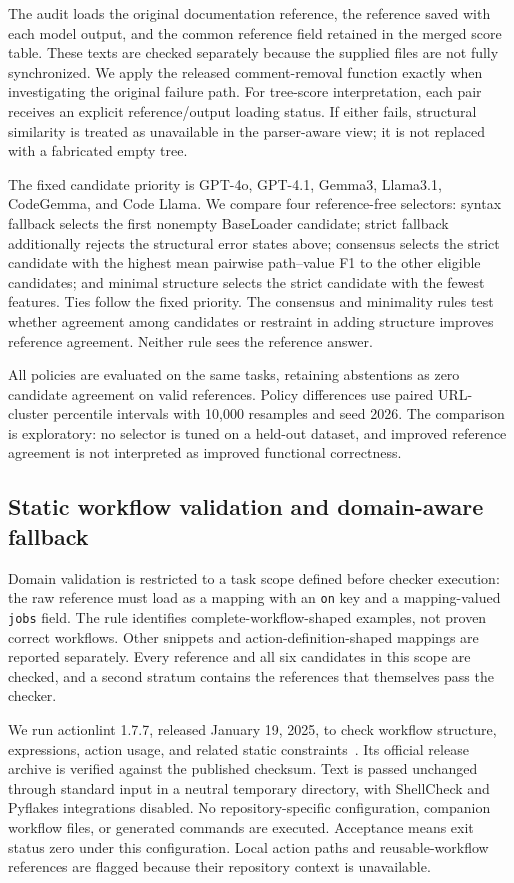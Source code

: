 The audit loads the original documentation reference, the reference saved with each model output, and the common reference field retained in the merged score table. These texts are checked separately because the supplied files are not fully synchronized. We apply the released comment-removal function exactly when investigating the original failure path. For tree-score interpretation, each pair receives an explicit reference/output loading status. If either fails, structural similarity is treated as unavailable in the parser-aware view; it is not replaced with a fabricated empty tree.

The fixed candidate priority is GPT-4o, GPT-4.1, Gemma3, Llama3.1, CodeGemma, and Code Llama. We compare four reference-free selectors: syntax fallback selects the first nonempty BaseLoader candidate; strict fallback additionally rejects the structural error states above; consensus selects the strict candidate with the highest mean pairwise path--value F1 to the other eligible candidates; and minimal structure selects the strict candidate with the fewest features. Ties follow the fixed priority. The consensus and minimality rules test whether agreement among candidates or restraint in adding structure improves reference agreement. Neither rule sees the reference answer.

All policies are evaluated on the same tasks, retaining abstentions as zero candidate agreement on valid references. Policy differences use paired URL-cluster percentile intervals with 10,000 resamples and seed 2026. The comparison is exploratory: no selector is tuned on a held-out dataset, and improved reference agreement is not interpreted as improved functional correctness.

\subsection{Static workflow validation and domain-aware fallback}
Domain validation is restricted to a task scope defined before checker execution: the raw reference must load as a mapping with an \texttt{on} key and a mapping-valued \texttt{jobs} field. The rule identifies complete-workflow-shaped examples, not proven correct workflows. Other snippets and action-definition-shaped mappings are reported separately. Every reference and all six candidates in this scope are checked, and a second stratum contains the references that themselves pass the checker.

We run actionlint 1.7.7, released January 19, 2025, to check workflow structure, expressions, action usage, and related static constraints~\cite{actionlint}. Its official release archive is verified against the published checksum. Text is passed unchanged through standard input in a neutral temporary directory, with ShellCheck and Pyflakes integrations disabled. No repository-specific configuration, companion workflow files, or generated commands are executed. Acceptance means exit status zero under this configuration. Local action paths and reusable-workflow references are flagged because their repository context is unavailable.

